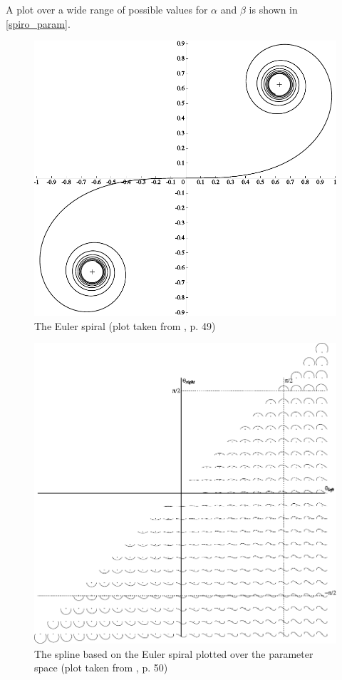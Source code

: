 A plot over a wide range of possible values for $\alpha$ and $\beta$ is shown in \autoref{spiro_param}.

\begin{figure}
\includegraphics[width=\textwidth]{images/smooth/euler_spiral.pdf}
\caption{The Euler spiral (plot taken from \cite{levien2009spiral}, p. 49)}\label{euler_spiral}
\end{figure}

\begin{figure}
\includegraphics[width=\textwidth]{images/smooth/euler_spline_primitive.pdf}
\caption{The spline based on the Euler spiral plotted over the parameter space (plot taken from \cite{levien2009spiral}, p. 50)}\label{spiro_param}
\end{figure}

